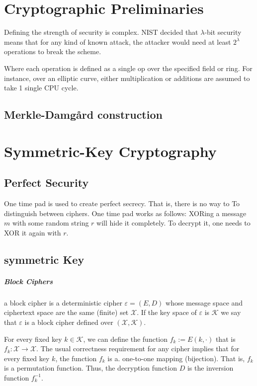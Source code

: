 
\chapter{Cryptographic Preliminaries}
\begin{definition}
  Defining the strength of security is complex. NIST decided that $\lambda$-bit security 
  means that for any kind of known attack, the attacker would need at least $2^{\lambda}$
  operations to break the scheme.

  Where each operation is defined as a single op over the specified field or ring.
  For instance, over an elliptic curve, either multiplication or additions are assumed to 
  take 1 single CPU cycle.
  
\end{definition}


\section{Merkle-Damgård construction} 

\chapter{Symmetric-Key Cryptography}
\section{Perfect Security}
One time pad is used to create perfect secrecy. That is, there is no way to 
To distinguish between ciphers.  One time pad works as follows:
XORing a message $m$ with some random string $r$ will hide it completely. 
To decrypt it, one needs to XOR it again with $r$.

\section{symmetric Key}
\paragraph{Block Ciphers}
a block cipher is a  deterministic cipher $\varepsilon=(E,D)$ whose message space and
ciphertext space are the same (finite) set $\mathcal{X}$. If the key space of $\varepsilon$ is $\mathcal{K}$ we say that $\varepsilon$ is a block cipher defined over
$(\mathcal{X},\mathcal{K})$.

For every fixed key $k \in\mathcal{K}$, we can define the function $f_k := E(k,\cdot)$
that is $f_k: \mathcal{X} \to \mathcal{X}$. 
The usual correctness requirement for any cipher implies that for every
fixed key $k$, the function $f_k$ is a. one-to-one mapping (bijection). That is, $f_k$ is a permutation function. Thus, the decryption function $D$ is the inversion function $f_k^{-1}$.


